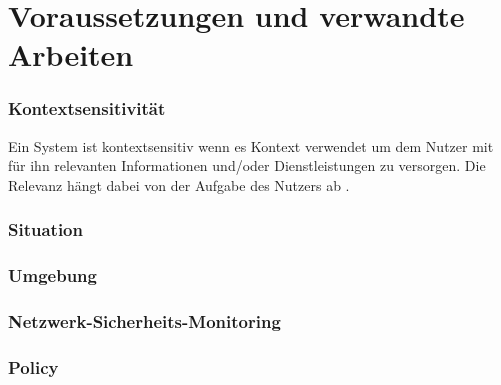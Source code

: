 \chapter{Voraussetzungen und verwandte Arbeiten}
\label{cha:requirements_and_related_work}




\subsection{Kontextsensitivität}

Ein System ist kontextsensitiv wenn es Kontext verwendet um dem Nutzer mit für ihn relevanten Informationen und/oder Dienstleistungen zu versorgen. Die Relevanz hängt dabei von der Aufgabe des Nutzers ab \citep{dey_understanding_2001}.
\subsection{Situation}

\subsection{Umgebung}

\subsection{Netzwerk-Sicherheits-Monitoring}
\subsection{Policy}

